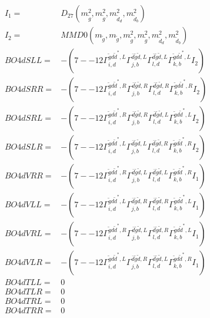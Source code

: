 \documentclass[A4,landscape]{article}
\begin{document}
\begin{align} 
I_1 = & D_{27}(m^2_{\tilde{g}}, m^2_{\tilde{g}}, m^2_{\tilde{d}_{{d}}}, m^2_{\tilde{d}_{{b}}}) \\ 
I_2 = & MMD0(m_{\tilde{g}}, m_{\tilde{g}}, m^2_{\tilde{g}}, m^2_{\tilde{g}}, m^2_{\tilde{d}_{{d}}}, m^2_{\tilde{d}_{{b}}}) \\ 
  BO4dSLL= & -(7
--
12 \Gamma^{\tilde{g} d \tilde{d}^*,L}_{i, d} \Gamma^{\bar{d}\tilde{g} \tilde{d} ,L}_{j, b} \Gamma^{\bar{d}\tilde{g} \tilde{d} ,L}_{l, d} \Gamma^{\tilde{g} d \tilde{d}^*,L}_{k, b} I_2) \\ 
  BO4dSRR= & -(7
--
12 \Gamma^{\tilde{g} d \tilde{d}^*,R}_{i, d} \Gamma^{\bar{d}\tilde{g} \tilde{d} ,R}_{j, b} \Gamma^{\bar{d}\tilde{g} \tilde{d} ,R}_{l, d} \Gamma^{\tilde{g} d \tilde{d}^*,R}_{k, b} I_2) \\ 
  BO4dSRL= & -(7
--
12 \Gamma^{\tilde{g} d \tilde{d}^*,R}_{i, d} \Gamma^{\bar{d}\tilde{g} \tilde{d} ,R}_{j, b} \Gamma^{\bar{d}\tilde{g} \tilde{d} ,L}_{l, d} \Gamma^{\tilde{g} d \tilde{d}^*,L}_{k, b} I_2) \\ 
  BO4dSLR= & -(7
--
12 \Gamma^{\tilde{g} d \tilde{d}^*,L}_{i, d} \Gamma^{\bar{d}\tilde{g} \tilde{d} ,L}_{j, b} \Gamma^{\bar{d}\tilde{g} \tilde{d} ,R}_{l, d} \Gamma^{\tilde{g} d \tilde{d}^*,R}_{k, b} I_2) \\ 
  BO4dVRR= & -(7
--
12 \Gamma^{\tilde{g} d \tilde{d}^*,R}_{i, d} \Gamma^{\bar{d}\tilde{g} \tilde{d} ,L}_{j, b} \Gamma^{\bar{d}\tilde{g} \tilde{d} ,L}_{l, d} \Gamma^{\tilde{g} d \tilde{d}^*,R}_{k, b} I_1) \\ 
  BO4dVLL= & -(7
--
12 \Gamma^{\tilde{g} d \tilde{d}^*,L}_{i, d} \Gamma^{\bar{d}\tilde{g} \tilde{d} ,R}_{j, b} \Gamma^{\bar{d}\tilde{g} \tilde{d} ,R}_{l, d} \Gamma^{\tilde{g} d \tilde{d}^*,L}_{k, b} I_1) \\ 
  BO4dVRL= & -(7
--
12 \Gamma^{\tilde{g} d \tilde{d}^*,R}_{i, d} \Gamma^{\bar{d}\tilde{g} \tilde{d} ,L}_{j, b} \Gamma^{\bar{d}\tilde{g} \tilde{d} ,R}_{l, d} \Gamma^{\tilde{g} d \tilde{d}^*,L}_{k, b} I_1) \\ 
  BO4dVLR= & -(7
--
12 \Gamma^{\tilde{g} d \tilde{d}^*,L}_{i, d} \Gamma^{\bar{d}\tilde{g} \tilde{d} ,R}_{j, b} \Gamma^{\bar{d}\tilde{g} \tilde{d} ,L}_{l, d} \Gamma^{\tilde{g} d \tilde{d}^*,R}_{k, b} I_1) \\ 
  BO4dTLL= & 0 \\ 
  BO4dTLR= & 0 \\ 
  BO4dTRL= & 0 \\ 
  BO4dTRR= & 0 \\ 
\end{align} 
\end{document}
